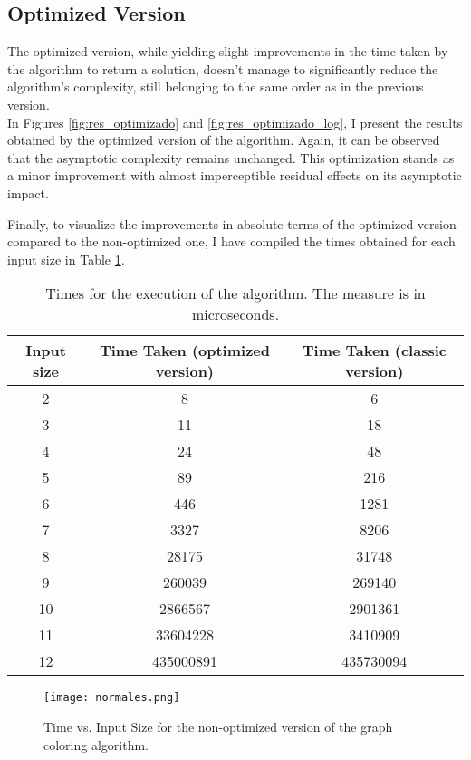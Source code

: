 \documentclass[british,a4paper,11pt,titlepage]{article}
\begin{document}
\subsection{Optimized Version}
The optimized version, while yielding slight improvements in the time taken by the algorithm to return a solution, doesn't manage to significantly reduce the algorithm's complexity, still belonging to the same order as in the previous version.
\\
In Figures \ref{fig:res_optimizado} and \ref{fig:res_optimizado_log}, I present the results obtained by the optimized version of the algorithm. Again, it can be observed that the asymptotic complexity remains unchanged. This optimization stands as a minor improvement with almost imperceptible residual effects on its asymptotic impact.

Finally, to visualize the improvements in absolute terms of the optimized version compared to the non-optimized one, I have compiled the times obtained for each input size in Table \ref{tab:tabla_resultados}.

\begin{table}[p]
\centering
\begin{tabular}{ccc}
\hline

Input size & Time Taken (optimized version) & Time Taken (classic version) \\ \hline
2   &   8           & 6             \\
3   &   11          & 18            \\
4   &   24          & 48            \\
5   &   89          & 216           \\
6   &   446         & 1281          \\
7   &   3327        & 8206          \\
8   &   28175       & 31748         \\
9   &   260039      & 269140        \\
10  &   2866567     & 2901361       \\
11  &   33604228    & 3410909       \\
12  &   435000891   & 435730094     \\ \hline
\end{tabular}
\caption[Times for the execution of the algorithm]{Times for the execution of the algorithm. The measure is in microseconds.}
\label{tab:tabla_resultados}
\end{table}

\begin{figure}[p]
  \centering
  \texttt{[image: normales.png]}%
  \hspace{0.1\linewidth}%
  \caption[Time vs Input Size (classic version)]{Time vs. Input Size for the non-optimized version of the graph coloring algorithm.}
  \label{fig:res_normales}
\end{figure}
\end{document}

